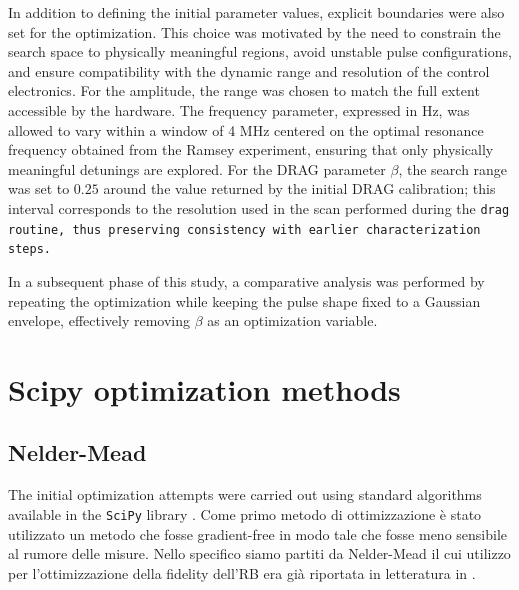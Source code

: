In addition to defining the initial parameter values, explicit boundaries were also set for the optimization. 
This choice was motivated by the need to constrain the search space to physically meaningful regions, avoid unstable pulse configurations, and ensure compatibility with the dynamic range and resolution of the control electronics.
For the amplitude, the range was chosen to match the full extent accessible by the hardware. 
The frequency parameter, expressed in Hz, was allowed to vary within a window of 4 MHz centered on the optimal resonance frequency obtained from the Ramsey experiment, ensuring that only physically meaningful detunings are explored. 
For the DRAG parameter $\beta$, the search range was set to $0.25$ around the value returned by the initial DRAG calibration; this interval corresponds to the resolution used in the scan performed during the \tt{drag} routine, thus preserving consistency with earlier characterization steps.

In a subsequent phase of this study, a comparative analysis was performed by repeating the optimization while keeping the pulse shape fixed to a Gaussian envelope, effectively removing $\beta$ as an optimization variable. 


\section{Scipy optimization methods}\label{Sec:OptimizationMethods}

\subsection{Nelder-Mead}
The initial optimization attempts were carried out using standard algorithms available in the \texttt{SciPy} library \cite{SciPy-NMeth}.
Come primo metodo di ottimizzazione è stato utilizzato un metodo che fosse gradient-free in modo tale che fosse meno sensibile al rumore delle misure. 
Nello specifico siamo partiti da Nelder-Mead il cui utilizzo per l'ottimizzazione della fidelity dell'RB era già riportata in letteratura in \cite{kelly_optimal_2014}.

